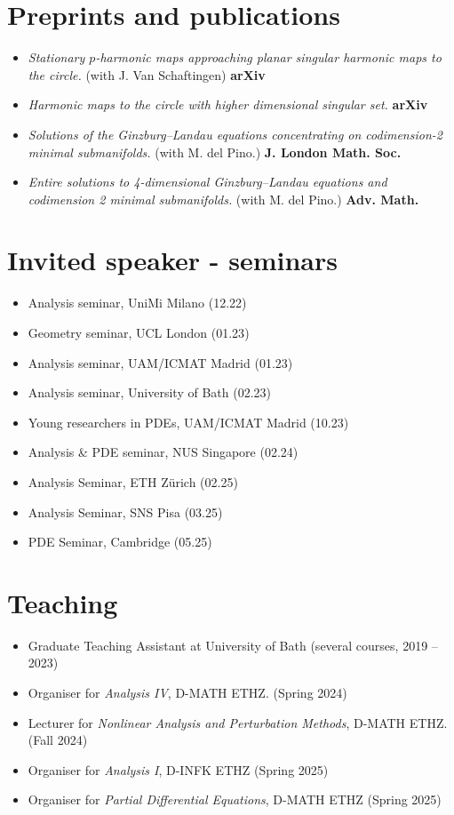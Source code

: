 \documentclass[a4paper,11pt]{article}
\begin{document}
\section*{Preprints and publications}
\noindent
\begin{itemize}
	\item \emph{Stationary $p$-harmonic maps approaching planar singular harmonic maps to the circle.} (with J. Van Schaftingen) {\bf arXiv}
	\item \emph{Harmonic maps to the circle with higher dimensional singular set.} {\bf arXiv}
	\item \emph{Solutions of the Ginzburg--Landau equations concentrating on codimension-2 minimal submanifolds.} (with M. del Pino.) {\bf J. London Math. Soc.}
	\item \emph{Entire solutions to 4-dimensional Ginzburg--Landau equations and codimension 2 minimal submanifolds.} (with M. del Pino.) {\bf Adv. Math.}
\end{itemize}

\vspace{5mm}

\section*{Invited speaker - seminars}
\noindent
\begin{itemize}
	\item Analysis seminar, UniMi Milano ({12.22})
	\item Geometry seminar, UCL London ({01.23})
	\item Analysis seminar,  UAM/ICMAT Madrid (01.23)
	\item Analysis seminar, University of Bath (02.23)
	\item Young researchers in PDEs, UAM/ICMAT Madrid (10.23)
	\item Analysis \& PDE seminar, NUS Singapore (02.24)
	\item Analysis Seminar, ETH Z\"urich (02.25)
	\item Analysis Seminar, SNS Pisa (03.25)
	\item PDE Seminar, Cambridge (05.25)
\end{itemize}
\vspace{5mm}

\section*{Teaching}
\noindent
\begin{itemize}
	\item Graduate Teaching Assistant at University of Bath (several courses, 2019 -- 2023)
	\item Organiser for \emph{Analysis IV}, D-MATH ETHZ. (Spring 2024)
	\item Lecturer for \emph{Nonlinear Analysis and Perturbation Methods}, D-MATH ETHZ. (Fall 2024)
	\item Organiser for \emph{Analysis I}, D-INFK ETHZ (Spring 2025)
	\item Organiser for \emph{Partial Differential Equations}, D-MATH ETHZ (Spring 2025)
\end{itemize}
\vspace{5mm}
\end{document}
